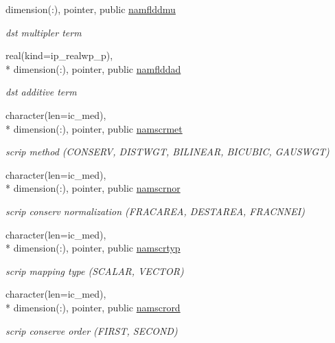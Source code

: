 \begin{DoxyCompactItemize}
dimension(\+:), pointer, public \hyperlink{classmod__oasis__namcouple_ad81bb4f19a71f0fcf8655cb9d39a3380}{namflddmu}
\begin{DoxyCompactList}\small\item\em dst multipler term \end{DoxyCompactList}\item 
real(kind=ip\+\_\+realwp\+\_\+p), \\*
dimension(\+:), pointer, public \hyperlink{classmod__oasis__namcouple_af1e31f45ea1cd7a7b64a8a7dc2cec4ee}{namflddad}
\begin{DoxyCompactList}\small\item\em dst additive term \end{DoxyCompactList}\item 
character(len=ic\+\_\+med), \\*
dimension(\+:), pointer, public \hyperlink{classmod__oasis__namcouple_a51c19e0892a72acc3dca2adb046ed175}{namscrmet}
\begin{DoxyCompactList}\small\item\em scrip method (C\+O\+N\+S\+E\+R\+V, D\+I\+S\+T\+W\+G\+T, B\+I\+L\+I\+N\+E\+A\+R, B\+I\+C\+U\+B\+I\+C, G\+A\+U\+S\+W\+G\+T) \end{DoxyCompactList}\item 
character(len=ic\+\_\+med), \\*
dimension(\+:), pointer, public \hyperlink{classmod__oasis__namcouple_a392f40531007d5dcc084e6ad4a393fd7}{namscrnor}
\begin{DoxyCompactList}\small\item\em scrip conserv normalization (F\+R\+A\+C\+A\+R\+E\+A, D\+E\+S\+T\+A\+R\+E\+A, F\+R\+A\+C\+N\+N\+E\+I) \end{DoxyCompactList}\item 
character(len=ic\+\_\+med), \\*
dimension(\+:), pointer, public \hyperlink{classmod__oasis__namcouple_a8ddbaabd22bbf485888b1df5f3578909}{namscrtyp}
\begin{DoxyCompactList}\small\item\em scrip mapping type (S\+C\+A\+L\+A\+R, V\+E\+C\+T\+O\+R) \end{DoxyCompactList}\item 
character(len=ic\+\_\+med), \\*
dimension(\+:), pointer, public \hyperlink{classmod__oasis__namcouple_ac881ced105604879ada860fabd677481}{namscrord}
\begin{DoxyCompactList}\small\item\em scrip conserve order (F\+I\+R\+S\+T, S\+E\+C\+O\+N\+D) \end{DoxyCompactList}\item 

\end{DoxyCompactItemize}
